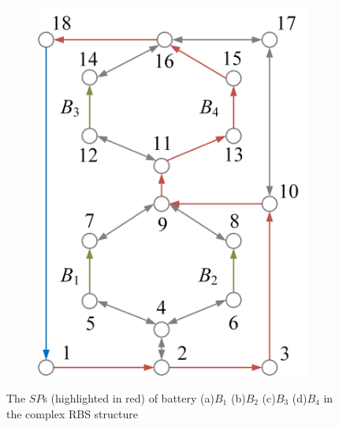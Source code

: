 \documentclass{article}
\begin{document}
\begin{figure}[htbp]
\begin{subfigure}[b]{0.45\textwidth}
        \includegraphics[width=\textwidth]{../attachments/ef-sp4.png}
        \caption{}
        \label{fig:sp4}
    \end{subfigure}
    \caption{
        The $SP$s (highlighted in red) of battery (a)$B_1$ (b)$B_2$ (c)$B_3$ (d)$B_4$ in the complex RBS structure 
        }
\end{figure}
\end{document}
